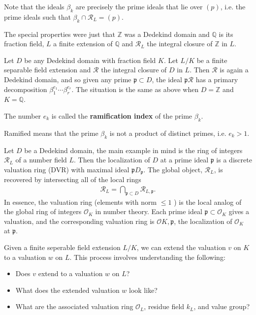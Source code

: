 \documentclass[12pt]{article}
\begin{document}
Note that the ideals $\beta_k$ are precisely the prime ideals that lie over $(p)$, i.e.
the prime ideals such that $\beta_k \cap \mathcal{R}_L = (p)$.

The special properties were just that $\mathbb{Z}$ was a Dedekind domain and $\mathbb{Q}$ is
its fraction field, $L$ a finite extension of $\mathbb{Q}$ and $\mathcal{R}_L$ the integral closure of $\mathbb{Z}$
in $L$.

Let $D$ be any Dedekind domain with fraction field $K$. Let $L/K$ be a
finite separable field extension and $\mathcal{R}$ the integral closure of $D$ in $L$. Then $\mathcal{R}$ is again a Dedekind domain, and so given any prime $\mathfrak{p} \subset D$, the ideal $\mathfrak{p}\mathcal{R}$ has a primary decomposition $\beta_1^{e_1} \cdots \beta_r^{e_r}$. The situation is the same as above when $D = \mathbb{Z}$ and $K = \mathbb{Q}$.

The number $e_k$ is called the \textbf{ramification index} of the prime $\beta_k$.

Ramified means that the prime $\beta_k$ is not a product of distinct primes, i.e. $e_k > 1$.

Let $D$ be a Dedekind domain, the main example in mind is the ring of integers $\mathcal{R}_L$ of a number field $L$. Then the localization of $D$ at a prime ideal $\mathfrak{p}$ is a discrete valuation ring (DVR) with maximal ideal $\mathfrak{p}D_\mathfrak{p}$. The global object, $\mathcal{R}_L$, is recovered by intersecting all of the local rings \begin{align*}
    \mathcal{R}_L = \bigcap_{\mathfrak{p} \subset D} \mathcal{R}_{L,\mathfrak{p}}.
\end{align*}
In essence, the valuation ring (elements with norm $ \leq 1$ ) is the local analog of the global ring of integers $\mathcal{O}_K$ in number theory. Each prime ideal $\mathfrak{p} \subset \mathcal{O}_K$ gives a valuation, and the corresponding valuation ring is $\mathcal{O}{K,\mathfrak{p}}$, the localization of $\mathcal{O}_K$ at $\mathfrak{p}$.

Given a finite seperable field extension $L/K$, we can extend the valuation $v$ on $K$ to a valuation $w$ on $L$. This process involves understanding the following:

\begin{itemize}
    \item Does $v$ extend to a valuation $w$ on $L$?
    \item What does the extended valuation $w$ look like?
    \item What are the associated valuation ring $\mathcal{O}_L$, residue field $k_L$, and value group?
\end{itemize}
\end{document}
